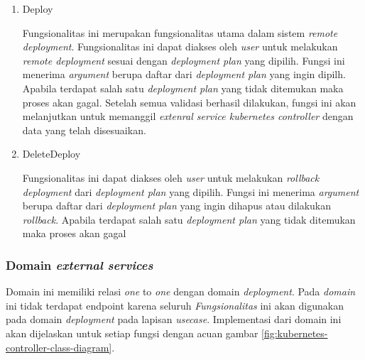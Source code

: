 \begin{enumerate}
  \item Deploy

        Fungsionalitas ini merupakan fungsionalitas utama dalam sistem \textit{remote deployment}. Fungsionalitas ini dapat diakses oleh \textit{user} untuk melakukan \textit{remote deployment} sesuai dengan \textit{deployment plan} yang dipilih. Fungsi ini menerima \textit{argument} berupa daftar dari \textit{deployment plan} yang ingin dipilh. Apabila terdapat salah satu \textit{deployment plan} yang tidak ditemukan maka proses akan gagal. Setelah semua validasi berhasil dilakukan, fungsi ini akan melanjutkan untuk memanggil \textit{extenral service kubernetes controller} dengan data yang telah disesuaikan.

  \item DeleteDeploy

        Fungsionalitas ini dapat diakses oleh \textit{user} untuk melakukan \textit{rollback deployment} dari \textit{deployment plan} yang dipilih. Fungsi ini menerima \textit{argument} berupa daftar dari \textit{deployment plan} yang ingin dihapus atau dilakukan \textit{rollback}. Apabila terdapat salah satu \textit{deployment plan} yang tidak ditemukan maka proses akan gagal

\end{enumerate}

\subsubsection{Domain \textit{external services}}

Domain ini memiliki relasi \textit{one} to \textit{one} dengan domain \textit{deployment}. Pada \textit{domain} ini tidak terdapat endpoint karena seluruh \textit{Fungsionalitas} ini akan digunakan pada domain \textit{deployment} pada lapisan \textit{usecase}. Implementasi dari domain ini akan dijelaskan untuk setiap fungsi dengan acuan gambar \ref{fig:kubernetes-controller-class-diagram}.

\pagebreak

